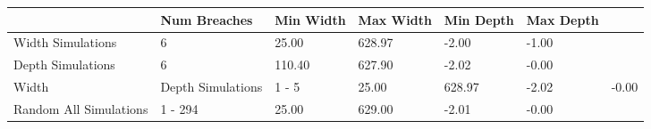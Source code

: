 \begin{tabular}{llllll}
\toprule
{} & Num Breaches & Min Width & Max Width & Min Depth & Max Depth \\
\midrule
Width Simulations         &            6 &     25.00 &    628.97 &     -2.00 &     -1.00 \\
Depth Simulations         &            6 &    110.40 &    627.90 &     -2.02 &     -0.00 \\
Width & Depth Simulations &        1 - 5 &     25.00 &    628.97 &     -2.02 &     -0.00 \\
Random All Simulations    &      1 - 294 &     25.00 &    629.00 &     -2.01 &     -0.00 \\
\bottomrule
\end{tabular}
